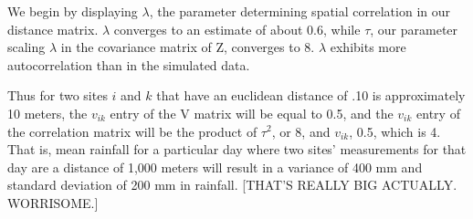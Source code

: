 \documentclass[12pt]{article}
\begin{document}





We begin by displaying $\lambda$, the parameter determining spatial correlation in our distance matrix. $\lambda$ converges to an estimate of about 0.6, while $\tau$, our parameter scaling $\lambda$ in the covariance matrix of Z, converges to 8. $\lambda$ exhibits more autocorrelation than in the simulated data.



Thus for two sites $i$ and $k$ that have an euclidean distance of .10 is approximately 10 meters, the $v_{ik}$ entry of the V matrix will be equal to 0.5, and the $v_{ik}$ entry of the correlation matrix will be the product of $\tau^{2}$, or 8, and $v_{ik}$, 0.5, which is 4. That is, mean rainfall for a particular day where two sites' measurements for that day are a distance of 1,000 meters will result in a variance of 400 mm and standard deviation of 200 mm in rainfall. [THAT'S REALLY BIG ACTUALLY. WORRISOME.]










\end{document}
